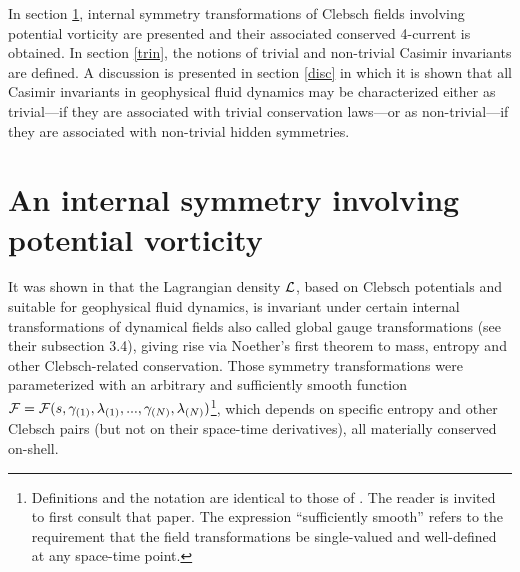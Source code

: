 \documentclass{article}
\numberwithin{equation}{section}
\begin{document}
In section \ref{defsym}, internal symmetry transformations of Clebsch fields involving potential vorticity are presented and their associated conserved 4-current is obtained. In section \ref{trin}, the notions of trivial and non-trivial Casimir invariants are defined. A discussion is presented in section \ref{disc} in which it is shown that all Casimir invariants in geophysical fluid dynamics may be characterized either as trivial---if they are associated with trivial conservation laws---or as non-trivial---if they are associated with non-trivial hidden symmetries.

\section{An internal symmetry involving potential vorticity}\label{defsym}
It was shown in \cite{Charron18b} that the Lagrangian density $\cal L$, based on Clebsch potentials and suitable for geophysical fluid dynamics, is invariant under certain internal transformations of dynamical fields also called global gauge transformations (see their subsection 3.4), giving rise via Noether's first theorem to mass, entropy and other Clebsch-related conservation. Those symmetry transformations were parameterized with an arbitrary and sufficiently smooth function ${\cal F}={\cal F}(s,\gamma_{(1)},\lambda_{(1)},...,\gamma_{(N)},\lambda_{(N)})$\footnote[1]{Definitions and the notation are identical to those of \cite{Charron18b}. The reader is invited to first consult that paper. The expression ``sufficiently smooth'' refers to the requirement that the field transformations be single-valued and well-defined at any space-time point.}, which depends on specific entropy and other Clebsch pairs (but not on their space-time derivatives), all materially conserved on-shell.
\end{document}
